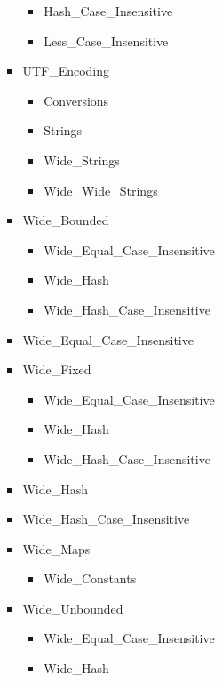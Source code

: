 \documentclass[english]{article}
\begin{document}
\begin{scriptsize}
\begin{multicols*}{5}
\begin{itemize}[leftmargin=0mm]
\begin{itemize}[leftmargin=5mm]
\begin{itemize}[leftmargin=5mm]
\begin{itemize}[leftmargin=5mm]
               \item[] Hash\_Case\_Insensitive
               \item[] Less\_Case\_Insensitive
            \end{itemize}
            \item[] UTF\_Encoding
            \begin{itemize}[leftmargin=5mm]
               \item[] Conversions
               \item[] Strings
               \item[] Wide\_Strings
               \item[] Wide\_Wide\_Strings
            \end{itemize}
            \item[] Wide\_Bounded
            \begin{itemize}[leftmargin=5mm]
               \item[] Wide\_Equal\_Case\_Insensitive
               \item[] Wide\_Hash
               \item[] Wide\_Hash\_Case\_Insensitive
            \end{itemize}
            \item[] Wide\_Equal\_Case\_Insensitive
            \item[] Wide\_Fixed
            \begin{itemize}[leftmargin=5mm]
               \item[] Wide\_Equal\_Case\_Insensitive
               \item[] Wide\_Hash
               \item[] Wide\_Hash\_Case\_Insensitive
            \end{itemize}
            \item[] Wide\_Hash
            \item[] Wide\_Hash\_Case\_Insensitive
            \item[] Wide\_Maps
            \begin{itemize}[leftmargin=5mm]
               \item[] Wide\_Constants
            \end{itemize}
            \item[] Wide\_Unbounded
            \begin{itemize}[leftmargin=5mm]
               \item[] Wide\_Equal\_Case\_Insensitive
               \item[] Wide\_Hash

\end{itemize}
\end{itemize}
\end{itemize}
\end{itemize}
\end{multicols*}
\end{scriptsize}
\end{document}

